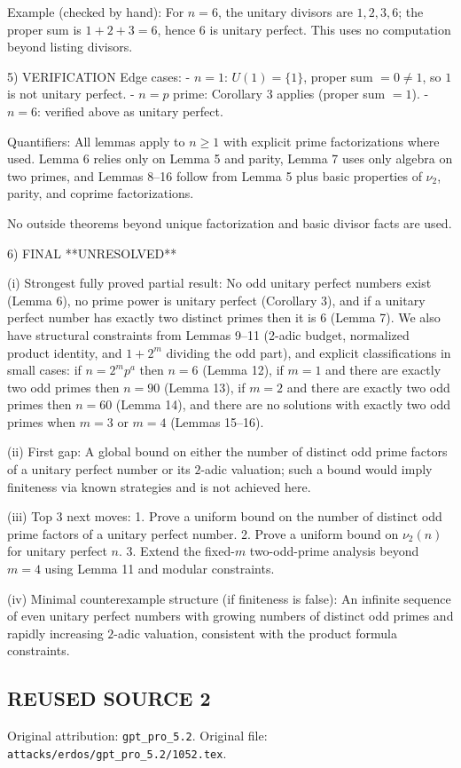 Example (checked by hand):
For $n=6$, the unitary divisors are $1,2,3,6$; the proper sum is $1+2+3=6$, hence $6$ is unitary perfect.
This uses no computation beyond listing divisors.

5) VERIFICATION
Edge cases:
- $n=1$: $U(1)=\{1\}$, proper sum $=0\ne 1$, so $1$ is not unitary perfect.
- $n=p$ prime: Corollary 3 applies (proper sum $=1$).
- $n=6$: verified above as unitary perfect.

Quantifiers:
All lemmas apply to $n\ge 1$ with explicit prime factorizations where used.
Lemma 6 relies only on Lemma 5 and parity, Lemma 7 uses only algebra on two primes, and
Lemmas 8--16 follow from Lemma 5 plus basic properties of $\nu_2$, parity, and coprime factorizations.

No outside theorems beyond unique factorization and basic divisor facts are used.

6) FINAL
**UNRESOLVED**

(i) Strongest fully proved partial result:
No odd unitary perfect numbers exist (Lemma 6), no prime power is unitary perfect (Corollary 3),
and if a unitary perfect number has exactly two distinct primes then it is $6$ (Lemma 7).
We also have structural constraints from Lemmas 9--11 (2-adic budget, normalized product identity,
and $1+2^m$ dividing the odd part), and explicit classifications in small cases:
if $n=2^m p^a$ then $n=6$ (Lemma 12), if $m=1$ and there are exactly two odd primes then $n=90$
(Lemma 13), if $m=2$ and there are exactly two odd primes then $n=60$ (Lemma 14), and
there are no solutions with exactly two odd primes when $m=3$ or $m=4$ (Lemmas 15--16).

(ii) First gap:
A global bound on either the number of distinct odd prime factors of a unitary perfect number or its
$2$-adic valuation; such a bound would imply finiteness via known strategies and is not achieved here.

(iii) Top 3 next moves:
1. Prove a uniform bound on the number of distinct odd prime factors of a unitary perfect number.
2. Prove a uniform bound on $\nu_2(n)$ for unitary perfect $n$.
3. Extend the fixed-$m$ two-odd-prime analysis beyond $m=4$ using Lemma 11 and modular constraints.

(iv) Minimal counterexample structure (if finiteness is false):
An infinite sequence of even unitary perfect numbers with growing numbers of distinct odd primes
and rapidly increasing $2$-adic valuation, consistent with the product formula constraints.


\subsection*{REUSED SOURCE 2}
Original attribution: \texttt{gpt\_pro\_5.2}.
Original file: \texttt{attacks/erdos/gpt\_pro\_5.2/1052.tex}.


